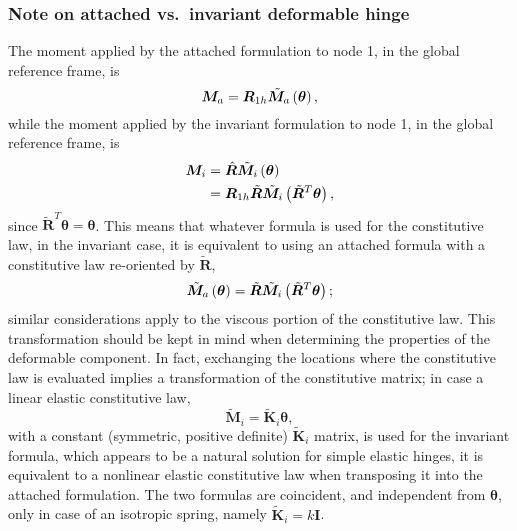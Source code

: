 \documentclass[10pt,dvips,fleqn,subeqn]{report}
\newcommand{\T}[1]{\bm{#1}}
\begin{document}
\subsubsection{Note on attached vs.\ invariant deformable hinge}
The moment applied by the attached formulation to node 1,
in the global reference frame, is
\begin{equation}
	\T{M}_a = \T{R}_{1h} \tilde{\T{M}}_a\plbr{\T{\theta}} ,
\end{equation}
while the moment applied by the invariant formulation to node 1,
in the global reference frame, is
\begin{align}
	\T{M}_i
	&= \hat{\T{R}} \tilde{\T{M}}_i\plbr{\T{\theta}} \nonumber \\
	&= \T{R}_{1h} \tilde{\T{R}} \tilde{\T{M}}_i\plbr{\tilde{\T{R}}^T \T{\theta}} ,
\end{align}
since $\tilde{\T{R}}^T \T{\theta}=\T{\theta}$.
This means that whatever formula is used for the constitutive law,
in the invariant case, it is equivalent to using an attached formula 
with a constitutive law re-oriented by $\tilde{\T{R}}$,
\begin{equation}
	\tilde{\T{M}}_a\plbr{\T{\theta}}
		= \tilde{\T{R}} \tilde{\T{M}}_i\plbr{\tilde{\T{R}}^T \T{\theta}} ;
\end{equation}
similar considerations apply to the viscous portion of the constitutive law.
This transformation should be kept in mind when determining the properties
of the deformable component.
In fact, exchanging the locations where the constitutive law is evaluated
implies a transformation of the constitutive matrix; in case a linear elastic
constitutive law,
\begin{equation}
	\tilde{\T{M}}_i = \tilde{\T{K}}_i \T{\theta} ,
\end{equation}
with a constant (symmetric, positive definite) $\tilde{\T{K}}_i$ matrix,
is used for the invariant formula, which appears to be a natural solution 
for simple elastic hinges, it is equivalent to a nonlinear elastic 
constitutive law when transposing it into the attached formulation.
The two formulas are coincident, and independent from $\T{\theta}$,
only in case of an isotropic spring, namely $\tilde{\T{K}}_i=k\T{I}$.
\end{document}
